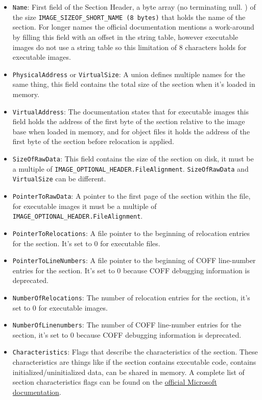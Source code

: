 \begin{itemize}
        \item \verb+Name+: First field of the Section Header, a byte array (no terminating null. ) of the size \verb+IMAGE_SIZEOF_SHORT_NAME (8 bytes)+ that holds the name of the section.  For longer names the official documentation mentions a work-around by filling this field with an offset in the string table, however executable images do not use a string table so this limitation of 8 characters holds for executable images.
        \item \verb+PhysicalAddress+ or \verb+VirtualSize+: A union defines multiple names for the same thing, this field contains the total size of the section when it’s loaded in memory.
        \item \verb+VirtualAddress+: The documentation states that for executable images this field holds the address of the first byte of the section relative to the image base when loaded in memory, and for object files it holds the address of the first byte of the section before relocation is applied.
        \item \verb+SizeOfRawData+: This field contains the size of the section on disk, it must be a multiple of \verb+IMAGE_OPTIONAL_HEADER.FileAlignment+. \verb+SizeOfRawData+ and \verb+VirtualSize+ can be different.
        \item \verb+PointerToRawData+: A pointer to the first page of the section within the file, for executable images it must be a multiple of \verb+IMAGE_OPTIONAL_HEADER.FileAlignment+.
        \item \verb+PointerToRelocations+: A file pointer to the beginning of relocation entries for the section. It’s set to 0 for executable files.
        \item \verb+PointerToLineNumbers+: A file pointer to the beginning of COFF line-number entries for the section. It’s set to 0 because COFF debugging information is deprecated.
        \item \verb+NumberOfRelocations+: The number of relocation entries for the section, it’s set to 0 for executable images.
        \item \verb+NumberOfLinenumbers+: The number of COFF line-number entries for the section, it’s set to 0 because COFF debugging information is deprecated.
        \item \verb+Characteristics+: Flags that describe the characteristics of the section.  These characteristics are things like if the section contains executable code, contains initialized/uninitialized data, can be shared in memory. A complete list of section characteristics flags can be found on the \href{https://learn.microsoft.com/en-us/windows/win32/debug/pe-format#section-flags}{official Microsoft documentation}.
\end{itemize}

